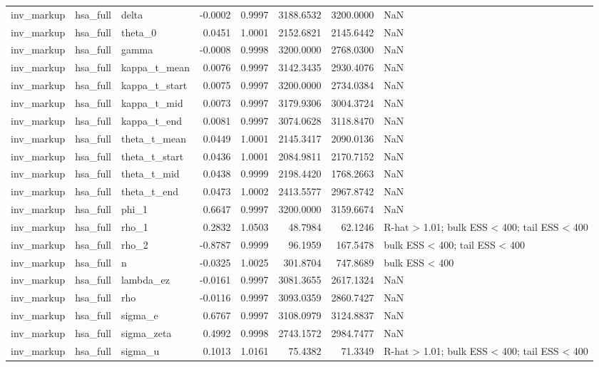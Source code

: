 \begin{tabular}{lllrrrrl}
inv\_markup & hsa\_full & delta & -0.0002 & 0.9997 & 3188.6532 & 3200.0000 & NaN \\
inv\_markup & hsa\_full & theta\_0 & 0.0451 & 1.0001 & 2152.6821 & 2145.6442 & NaN \\
inv\_markup & hsa\_full & gamma & -0.0008 & 0.9998 & 3200.0000 & 2768.0300 & NaN \\
inv\_markup & hsa\_full & kappa\_t\_mean & 0.0076 & 0.9997 & 3142.3435 & 2930.4076 & NaN \\
inv\_markup & hsa\_full & kappa\_t\_start & 0.0075 & 0.9997 & 3200.0000 & 2734.0384 & NaN \\
inv\_markup & hsa\_full & kappa\_t\_mid & 0.0073 & 0.9997 & 3179.9306 & 3004.3724 & NaN \\
inv\_markup & hsa\_full & kappa\_t\_end & 0.0081 & 0.9997 & 3074.0628 & 3118.8470 & NaN \\
inv\_markup & hsa\_full & theta\_t\_mean & 0.0449 & 1.0001 & 2145.3417 & 2090.0136 & NaN \\
inv\_markup & hsa\_full & theta\_t\_start & 0.0436 & 1.0001 & 2084.9811 & 2170.7152 & NaN \\
inv\_markup & hsa\_full & theta\_t\_mid & 0.0438 & 0.9999 & 2198.4420 & 1768.2663 & NaN \\
inv\_markup & hsa\_full & theta\_t\_end & 0.0473 & 1.0002 & 2413.5577 & 2967.8742 & NaN \\
inv\_markup & hsa\_full & phi\_1 & 0.6647 & 0.9997 & 3200.0000 & 3159.6674 & NaN \\
inv\_markup & hsa\_full & rho\_1 & 0.2832 & 1.0503 & 48.7984 & 62.1246 & R-hat > 1.01; bulk ESS < 400; tail ESS < 400 \\
inv\_markup & hsa\_full & rho\_2 & -0.8787 & 0.9999 & 96.1959 & 167.5478 & bulk ESS < 400; tail ESS < 400 \\
inv\_markup & hsa\_full & n & -0.0325 & 1.0025 & 301.8704 & 747.8689 & bulk ESS < 400 \\
inv\_markup & hsa\_full & lambda\_ez & -0.0161 & 0.9997 & 3081.3655 & 2617.1324 & NaN \\
inv\_markup & hsa\_full & rho & -0.0116 & 0.9997 & 3093.0359 & 2860.7427 & NaN \\
inv\_markup & hsa\_full & sigma\_e & 0.6767 & 0.9997 & 3108.0979 & 3124.8837 & NaN \\
inv\_markup & hsa\_full & sigma\_zeta & 0.4992 & 0.9998 & 2743.1572 & 2984.7477 & NaN \\
inv\_markup & hsa\_full & sigma\_u & 0.1013 & 1.0161 & 75.4382 & 71.3349 & R-hat > 1.01; bulk ESS < 400; tail ESS < 400 \\

\end{tabular}
